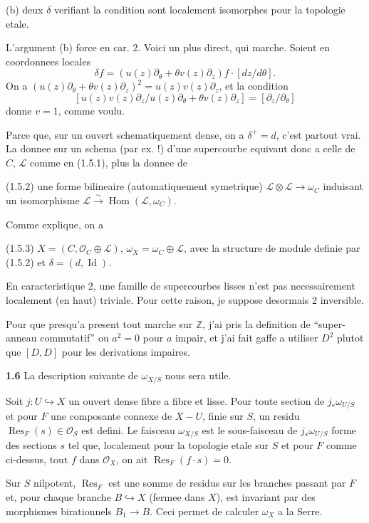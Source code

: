 \documentclass[11pt,a4paper]{article}
\theoremstyle{plain}
\theoremstyle{definition}
\DeclareMathOperator{\Hom}{Hom}
\DeclareMathOperator{\Res}{Res}
\DeclareMathOperator{\Id}{Id}
\begin{document}
(b) deux $\delta$ verifiant la condition sont localement isomorphes pour la topologie etale.

L'argument (b) force en car. 2. Voici un plus direct, qui marche. Soient en coordonnees locales
\[
\delta f = (u(z)\partial_\theta + \theta v(z)\partial_z)f \cdot [dz/d\theta].
\]
On a $(u(z)\partial_\theta + \theta v(z)\partial_z)^2 = u(z)v(z)\partial_z$, et la condition
\[
[u(z)v(z)\partial_z / u(z)\partial_\theta + \theta v(z)\partial_z] = [\partial_z / \partial_\theta]
\]
donne $v = 1$, comme voulu.

\newpage

Parce que, sur un ouvert schematiquement dense, on a $\delta^+ = d$, c'est partout vrai. La donnee sur un schema (par ex. !) d'une supercourbe equivaut donc a celle de $C$, $\mathcal{L}$ comme en (1.5.1), plus la donnee de

\noindent (1.5.2) une forme bilineaire (automatiquement symetrique) $\mathcal{L} \otimes \mathcal{L} \to \omega_C$ induisant un isomorphisme $\mathcal{L} \xrightarrow{\sim} \Hom(\mathcal{L}, \omega_C)$.

Comme explique, on a

\noindent (1.5.3) $X = (C, \mathcal{O}_C \oplus \mathcal{L})$, $\omega_X = \omega_C \oplus \mathcal{L}$, avec la structure de module definie par (1.5.2) et $\delta = (d, \Id)$.

En caracteristique 2, une famille de supercourbes lisses n'est pas necessairement localement (en haut) triviale. Pour cette raison, je suppose desormais 2 inversible.

Pour que presqu'a present tout marche sur $\mathbb{Z}$, j'ai pris la definition de ``super-anneau commutatif'' ou $a^2 = 0$ pour $a$ impair, et j'ai fait gaffe a utiliser $D^2$ plutot que $[D,D]$ pour les derivations impaires.

\medskip

\noindent \textbf{1.6} La description suivante de $\omega_{X/S}$ nous sera utile.

Soit $j : U \hookrightarrow X$ un ouvert dense fibre a fibre et lisse. Pour toute section de $j_*\omega_{U/S}$ et pour $F$ une composante connexe de $X-U$, finie sur $S$, un residu $\Res_F(s) \in \mathcal{O}_S$ est defini. Le faisceau $\omega_{X/S}$ est le sous-faisceau de $j_*\omega_{U/S}$ forme des sections $s$ tel que, localement pour la topologie etale sur $S$ et pour $F$ comme ci-dessus, tout $f$ dans $\mathcal{O}_X$, on ait $\Res_F(f \cdot s) = 0$.

Sur $S$ nilpotent, $\Res_F$ est une somme de residus sur les branches passant par $F$ et, pour chaque branche $B \hookrightarrow X$ (fermee dans $X$), est invariant par des morphismes birationnels $B_1 \to B$. Ceci permet de calculer $\omega_X$ a la Serre.
\end{document}
